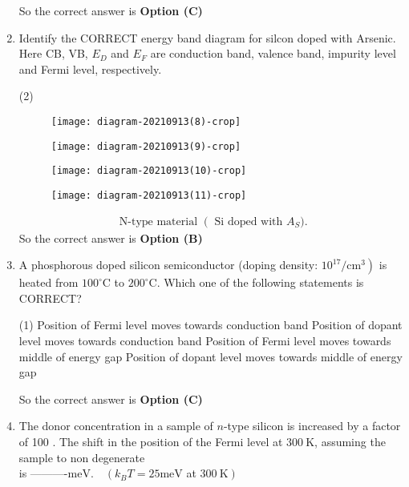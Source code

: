 \begin{enumerate}
\begin{answer}
		So the correct answer is \textbf{Option (C)}
	\end{answer}
	\item Identify the CORRECT energy band diagram for silcon doped with Arsenic. Here CB, VB, $E_{D}$ and $E_{F}$ are conduction band, valence band, impurity level and Fermi level, respectively.
	{	}
	\begin{tasks}(2)
		\task[\textbf{A.}] \begin{figure}[H]
			\centering
			\texttt{[image: diagram-20210913(8)-crop]}
		\end{figure}
		\task[\textbf{B.}] \begin{figure}[H]
			\centering
			\texttt{[image: diagram-20210913(9)-crop]}
		\end{figure}
		\task[\textbf{C.}] \begin{figure}[H]
			\centering
			\texttt{[image: diagram-20210913(10)-crop]}
		\end{figure}
		\task[\textbf{D.}] \begin{figure}[H]
			\centering
			\texttt{[image: diagram-20210913(11)-crop]}
		\end{figure}
	\end{tasks}
	\begin{answer}
		\begin{align*}
		\text{	N-type material }\left(\right.\text{ Si doped with }A_{S} ).
		\end{align*}
		So the correct answer is \textbf{Option (B)}
	\end{answer}
	\item A phosphorous doped silicon semiconductor (doping density: $\left.10^{17} / \mathrm{cm}^{3}\right)$ is heated from $100^{\circ} \mathrm{C}$ to $200^{\circ} \mathrm{C}$. Which one of the following statements is CORRECT?
	{	}
	\begin{tasks}(1)
		\task[\textbf{A.}] Position of Fermi level moves towards conduction band
		\task[\textbf{B.}] Position of dopant level moves towards conduction band
		\task[\textbf{C.}] Position of Fermi level moves towards middle of energy gap
		\task[\textbf{D.}] Position of dopant level moves towards middle of energy gap
	\end{tasks}
	\begin{answer}
		So the correct answer is \textbf{Option (C)}
	\end{answer}
	\item The donor concentration in a sample of $n$-type silicon is increased by a factor of 100 . The shift in the position of the Fermi level at $300 \mathrm{~K}$, assuming the sample to non degenerate\\ is ----------$\mathrm{meV} . \quad\left(k_{B} T=25 \mathrm{meV}\right.$ at $\left.300 \mathrm{~K}\right)$

\end{enumerate}
